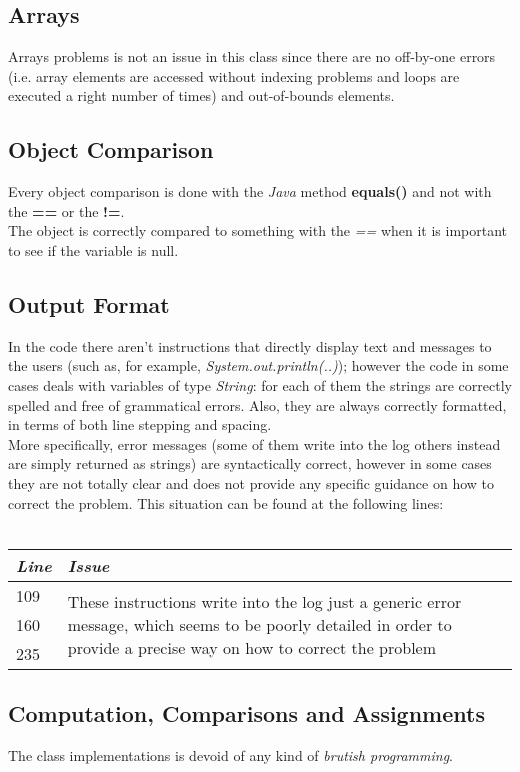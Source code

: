 \documentclass[11pt,a4paper]{report}
\begin{document}
\subsection{Arrays}
Arrays problems is not an issue in this class since there are no off-by-one errors (i.e. array elements are accessed without indexing problems and loops are executed a right number of times) and out-of-bounds elements.
\subsection{Object Comparison}
Every object comparison is done with the \textit{Java} method \textbf{equals()} and not with the \textbf{==} or the \textbf{!=}.\\The object is correctly compared to something with the \textit{==} when it is important to see if the variable is null.
\subsection{Output Format}
In the code there aren't instructions that directly display text and messages to the users (such as, for example, \textit{System.out.println(..)}); however the code in some cases deals with variables of type \textit{String}: for each of them the strings are correctly spelled and free of grammatical errors. Also, they are always correctly formatted, in terms of both line stepping and spacing.\\
More specifically, error messages (some of them write into the log others instead are simply returned as strings) are syntactically correct, however in some cases they are not totally clear and does not provide any specific guidance on how to correct the problem. This situation can be found at the following lines:\\
\\
\begin{tabularx}{\textwidth}{|l|X|}
	\hline
	\textit{Line} & \textit{Issue}\\
	\hline
	\hline
		109 & \multirow{3}{\linewidth}{These instructions write into the log just a generic error message, which seems to be poorly detailed in order to provide a precise way on how to correct the problem}\\
		160 & \\
		235 & \\
	\hline
\end{tabularx}

\subsection{Computation, Comparisons and Assignments}
The class implementations is devoid of any kind of \textit{brutish programming}.
\end{document}
